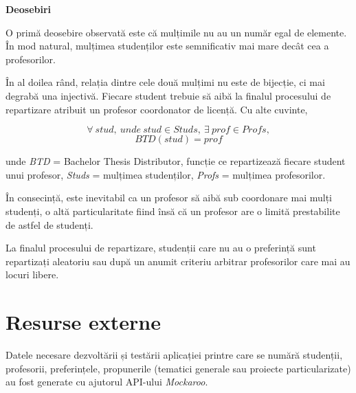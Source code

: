 \textbf{Deosebiri}

O primă deosebire observată este că mulțimile nu au un număr egal de elemente. În mod natural, mulțimea studenților este semnificativ mai mare decât cea a profesorilor.

În al doilea rând, relația dintre cele două mulțimi nu este de bijecție, ci mai degrabă una injectivă. Fiecare student trebuie să aibă la finalul procesului de repartizare atribuit un profesor coordonator de licență. Cu alte cuvinte,

\[\forall \: stud,\: unde\: stud \in Studs,\: \exists \: prof \in Profs,\] 
\[BTD(stud)=prof\]

unde \textit{BTD} = Bachelor Thesis Distributor, funcție ce repartizează fiecare student unui profesor, \textit{Studs} = mulțimea studenților, \textit{Profs} = mulțimea profesorilor.

În consecință, este inevitabil ca un profesor să aibă sub coordonare mai mulți studenți, o altă particularitate fiind însă că un profesor are o limită prestabilite de astfel de studenți.

La finalul procesului de repartizare, studenții care nu au o preferință sunt repartizați aleatoriu sau după un anumit criteriu arbitrar profesorilor care mai au locuri libere.

\section{Resurse externe}
Datele necesare dezvoltării și testării aplicației printre care se numără studenții, profesorii, preferințele, propunerile (tematici generale sau proiecte particularizate) au fost generate cu ajutorul API-ului \textit{Mockaroo}.